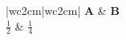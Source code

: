\documentclass{article}
\begin{document}
\begin{longtable}{|w{c}{2cm}|w{c}{2cm}|}
\hline
{}\textbf{A} & \textbf{B} \\
\hline
\endhead
\endfoot
$\frac12$ & $\frac14$ \\
\hline
\end{longtable}
\end{document}
